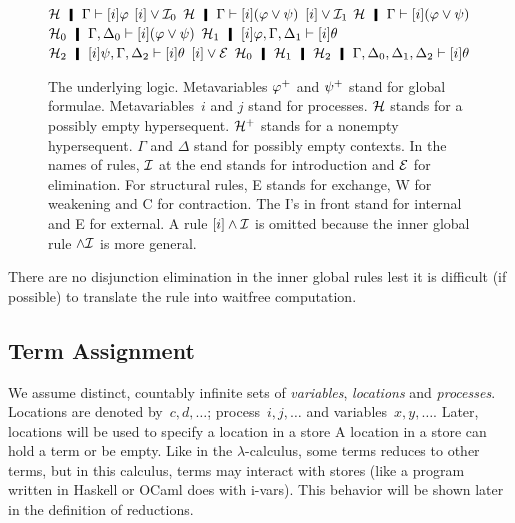 \begin{figure}
  \UnaryRule
   {$\hyper\hmid\Gamma\vdash[i]\varphi$}
   {$[i]\vee\mathcal I_0$}
   {$\hyper\hmid\Gamma\vdash[i](\varphi\vee\psi)$}
   \hfill
  \UnaryRule{$\hyper\hmid\Gamma\vdash[i]\psi$}
   {$[i]\vee\mathcal I_1$}
   {$\hyper\hmid\Gamma\vdash[i](\varphi\vee\psi)$}
   \TrinaryRule
   {$\hyper_0\hmid\G,\D_0\vdash[i](\phi\vee\psi)$}
   {$\hyper_1\hmid[i]\varphi, \G,\D_1\vdash[i]\theta$}
   {$\hyper_2\hmid[i]\psi,    \G,\D_2\vdash[i]\theta$}
   {$[i]\vee\mathcal E$}
   {$\hyper_0\hmid\hyper_1\hmid\hyper_2\hmid
 \G,\D_0,\D_1,\D_2\vdash[i]\theta$}
\caption[The underlying logic .]
 {The underlying logic.
 Metavariables ${\varphi}^+$ and ${\psi}^+$ stand for global formulae.
 Metavariables~$i$ and $j$ stand for processes.
 $\mathcal{H}$ stands for a possibly empty hypersequent.
 $\mathcal{H}^+$ stands for a nonempty hypersequent.
 $\Gamma$ and $\Delta$ stand for possibly empty contexts.
 In the names of rules, $\mathcal I$ at the end stands for introduction and $\mathcal E$ for
 elimination.  For structural rules, E stands for exchange, W for
 weakening and C for contraction.  The I's in front stand for internal and E
 for external.
 A rule $[i]\wedge\mathcal I$ is omitted because the inner global rule
 $\wedge\mathcal I$ is more general.
 }
\label{fig:logic}
\end{figure}

 There are no disjunction elimination in the inner global rules lest it
 is difficult (if possible) to translate the rule into
 waitfree computation.


\subsection{Term Assignment}
\label{term}

We assume distinct, countably infinite sets of \textit{variables},
\textit{locations}
and
\textit{processes}. 
Locations are denoted by~$c,d,\ldots$; process~$i,j, \ldots$ and variables~$x,
y, \ldots$.
Later, locations will be used to specify a location in a store
A location in a store can hold a term or be empty.
Like in the $\lambda$-calculus, some terms reduces to other
terms, but in this calculus, terms may interact with stores (like
a program written in Haskell or OCaml does with i-vars).
This behavior will be shown later in the definition of reductions.

